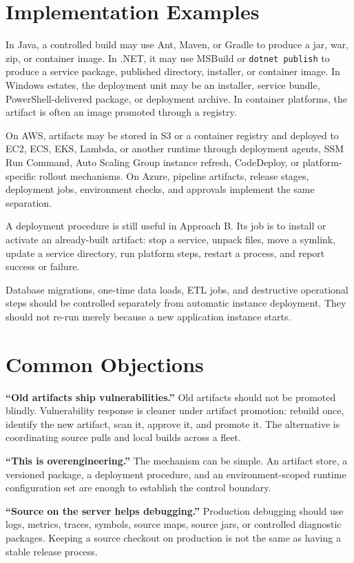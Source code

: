 \documentclass[11pt]{article}
\begin{document}
\section{Implementation Examples}

In Java, a controlled build may use Ant, Maven, or Gradle to produce a jar, war, zip, or container image. In .NET, it may use MSBuild or \texttt{dotnet publish} to produce a service package, published directory, installer, or container image. In Windows estates, the deployment unit may be an installer, service bundle, PowerShell-delivered package, or deployment archive. In container platforms, the artifact is often an image promoted through a registry.

On AWS, artifacts may be stored in S3 or a container registry and deployed to EC2, ECS, EKS, Lambda, or another runtime through deployment agents, SSM Run Command, Auto Scaling Group instance refresh, CodeDeploy, or platform-specific rollout mechanisms. On Azure, pipeline artifacts, release stages, deployment jobs, environment checks, and approvals implement the same separation.

A deployment procedure is still useful in Approach B. Its job is to install or activate an already-built artifact: stop a service, unpack files, move a symlink, update a service directory, run platform steps, restart a process, and report success or failure.

Database migrations, one-time data loads, ETL jobs, and destructive operational steps should be controlled separately from automatic instance deployment. They should not re-run merely because a new application instance starts.

\section{Common Objections}

\textbf{``Old artifacts ship vulnerabilities.''} Old artifacts should not be promoted blindly. Vulnerability response is cleaner under artifact promotion: rebuild once, identify the new artifact, scan it, approve it, and promote it. The alternative is coordinating source pulls and local builds across a fleet.

\textbf{``This is overengineering.''} The mechanism can be simple. An artifact store, a versioned package, a deployment procedure, and an environment-scoped runtime configuration set are enough to establish the control boundary.

\textbf{``Source on the server helps debugging.''} Production debugging should use logs, metrics, traces, symbols, source maps, source jars, or controlled diagnostic packages. Keeping a source checkout on production is not the same as having a stable release process.
\end{document}
